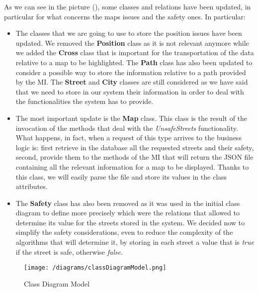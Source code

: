 		As we can see in the picture (), some classes and relations have been updated, in particular for what concerns the maps issues and the safety ones. In particular:
		
		\begin{itemize}
			\item The classes that we are going to use to store the position issues have been updated. We removed the \textbf{Position} class as it is not relevant anymore while we added the \textbf{Cross} class that is important for the transportation of the data relative to a map to be highlighted. The \textbf{Path} class has also been updated to consider a possible way to store the information relative to a path provided by the MI. The \textbf{Street} and \textbf{City} classes are still considered as we have said that we need to store in our system their information in order to deal with the functionalities the system has to provide.
			
			\item The most important update is the \textbf{Map} class. This class is the result of the invocation of the methods that deal with the \emph{UnsafeStreets} functionality. What happens, in fact, when a request of this type arrives to the business logic is: first retrieve in the database all the requested streets and their safety, second, provide them to the methods of the MI that will return the JSON file containing all the relevant information for a map to be displayed. Thanks to this class, we will easily parse the file and store its values in the class attributes.
			
			\item The \textbf{Safety} class has also been removed as it was used in the initial class diagram to define more precisely which were the relations that allowed to determine its value for the streets stored in the system. We decided now to simplify the safety considerations, even to reduce the complexity of the algorithms that will determine it, by storing in each street a value that is \emph{true} if the street is safe, otherwise \emph{false}.		
		\end{itemize}
		
		\newpage
		
		\begin{figure}[ht!bp]
			\centering
			\texttt{[image: /diagrams/classDiagramModel.png]}
			\caption{\label{fig:classDiagramModel} Class Diagram Model}
		\end{figure}
	
